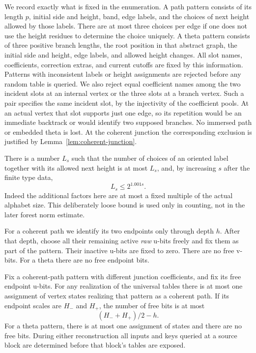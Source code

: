 We record exactly what is fixed in the enumeration.  A path pattern
consists of its length $p$, initial side and height, band, edge labels,
and the choices of next height allowed by those labels.  There are at
most three choices per edge if one does not use the height residues to
determine the choice uniquely.  A theta pattern consists of three
positive branch lengths, the root position in that abstract graph,
the initial side and height, edge labels, and allowed height changes.
All slot names, coefficients, correction extras, and current cutoffs
are fixed by this information.  Patterns with inconsistent labels or
height assignments are rejected before any random table is queried.
We also reject equal coefficient names among the two incident slots
at an internal vertex or the three slots at a branch vertex.
Such a pair specifies the same incident
slot, by the injectivity of the coefficient pools.  At an actual
vertex that slot supports just one edge, so its repetition would
be an immediate backtrack or would identify two supposed branches.
No immersed path or embedded theta is lost.  At the coherent
junction the corresponding exclusion is justified by
Lemma~\ref{lem:coherent-junction}.

There is a number $L_s$ such that the number of choices of an oriented
label together with its allowed next height is at most $L_s$, and,
by increasing $s$ after the finite type data,
\begin{equation}
\label{eq:pruning-label-count}
  L_s\leq2^{1.001s}.
\end{equation}
Indeed the additional factors here are at most a fixed multiple of
the actual alphabet size.  This deliberately loose bound is used
only in counting, not in the later forest norm estimate.

For a coherent path we identify its two endpoints only through depth
$h$.  After that depth, choose all their remaining active \emph{raw}
u-bits freely and fix them as part of the pattern.  Their inactive
u-bits are fixed to zero.  There are no free v-bits.  For a theta there
are no free endpoint bits.

\begin{lemma}
\label{lem:pruning-reconstruction}
Fix a coherent-path pattern with different junction coefficients,
and fix its free endpoint u-bits.  For any realization of the
universal tables there is at most one assignment of vertex states
realizing that pattern as a coherent path.  If its endpoint scales
are $H_-$ and $H_+$, the number of free bits is at most
\begin{equation}
\label{eq:pruning-free-bits}
  (H_-+H_+)/2-h.
\end{equation}
For a theta pattern, there is at most one assignment of states and
there are no free bits.  During either reconstruction all inputs and
keys queried at a source block are determined before that block's
tables are exposed.
\end{lemma}

